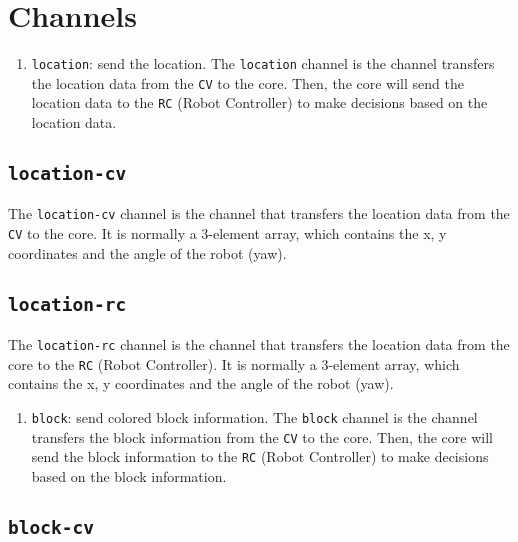 \documentclass[
]{article}
\author{}
\date{}
\begin{document}
\hypertarget{channels}{%
\section{Channels}\label{channels}}

\begin{enumerate}
\def\labelenumi{\arabic{enumi}.}
\item
  \texttt{location}: send the location. The \texttt{location} channel is
  the channel transfers the location data from the \texttt{CV} to the
  core. Then, the core will send the location data to the \texttt{RC}
  (Robot Controller) to make decisions based on the location data.
\end{enumerate}

\hypertarget{location-cv}{%
\subsection{\texorpdfstring{\texttt{location-cv}}{location-cv}}\label{location-cv}}

The \texttt{location-cv} channel is the channel that transfers the
location data from the \texttt{CV} to the core. It is normally a
3-element array, which contains the x, y coordinates and the angle of
the robot (yaw).

\hypertarget{location-rc}{%
\subsection{\texorpdfstring{\texttt{location-rc}}{location-rc}}\label{location-rc}}

The \texttt{location-rc} channel is the channel that transfers the
location data from the core to the \texttt{RC} (Robot Controller). It is
normally a 3-element array, which contains the x, y coordinates and the
angle of the robot (yaw).

\begin{enumerate}
\def\labelenumi{\arabic{enumi}.}
\item
  \texttt{block}: send colored block information. The \texttt{block}
  channel is the channel transfers the block information from the
  \texttt{CV} to the core. Then, the core will send the block
  information to the \texttt{RC} (Robot Controller) to make decisions
  based on the block information.
\end{enumerate}

\hypertarget{block-cv}{%
\subsection{\texorpdfstring{\texttt{block-cv}}{block-cv}}\label{block-cv}}
\end{document}
